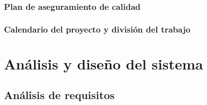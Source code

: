 \documentclass{article}
\begin{document}
\subsubsection{Plan de aseguramiento de calidad}

\subsubsection{Calendario del proyecto y división del trabajo}

\pagebreak

\section{Análisis y diseño del sistema}

\subsection{Análisis de requisitos}
\end{document}
